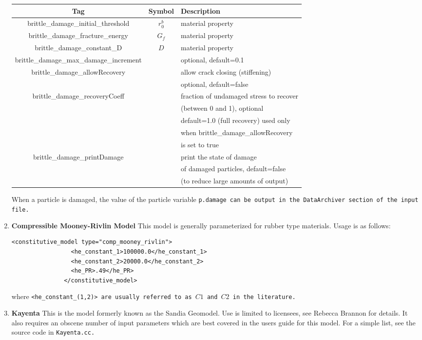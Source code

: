 \begin{enumerate}
\begin{table}[ht]
\centering
\begin{tabular} {c c l}
\hline
Tag & Symbol & Description \\
\hline
brittle\_damage\_initial\_threshold & $r_0^b$ &  material property \\
brittle\_damage\_fracture\_energy & $G_f$ &  material property \\
brittle\_damage\_constant\_D & $D$ & material property \\
brittle\_damage\_max\_damage\_increment & & optional, default=0.1 \\
brittle\_damage\_allowRecovery & & allow crack closing (stiffening) \\
& & optional, default=false \\
brittle\_damage\_recoveryCoeff & & fraction of undamaged stress to recover\\
& & (between 0 and 1), optional\\
& & default=1.0 (full recovery) used only\\
& & when brittle\_damage\_allowRecovery \\
& & is set to true  \\
brittle\_damage\_printDamage & & print the state of damage \\
& & of damaged particles, default=false \\
& & (to reduce large amounts of output) \\
\hline
\end{tabular}
\end{table}

When a particle is damaged, the value of the particle variable \tt p.damage \normalfont
can be output in the \tt DataArchiver \normalfont section of the input file.

\item{\bf Compressible Mooney-Rivlin Model} This model is generally parameterized
for rubber type materials.  Usage is as follows:
\begin{Verbatim}[fontsize=\footnotesize]
              <constitutive_model type="comp_mooney_rivlin">
                 <he_constant_1>100000.0</he_constant_1>
                 <he_constant_2>20000.0</he_constant_2>
                 <he_PR>.49</he_PR>
               </constitutive_model>
\end{Verbatim}
where \tt <he\_constant\_(1,2)> \normalfont are usually referred to
as $C1$ and $C2$ in the literature.

\item{\bf Kayenta} This is the model formerly known as the Sandia Geomodel.  Use
is limited to licensees, see Rebecca Brannon for details.  It also requires
an obscene number of input parameters which are best covered in the users
guide for this model.  For a simple list, see the source code in
\tt Kayenta.cc. \normalfont


\end{enumerate}
